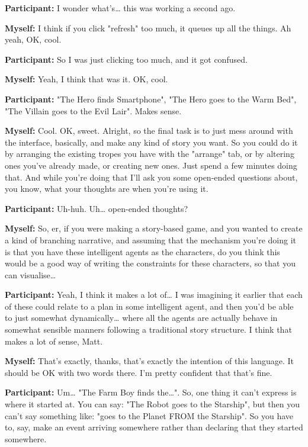 \documentclass[11pt]{report}
\begin{document}
\begin{linenumbers}
\textbf{Participant:} I wonder what's\ldots{} this was working a second ago.

\textbf{Myself:} I think if you click "refresh" too much, it queues up all the things. Ah yeah, OK, cool.

\textbf{Participant:} So I was just clicking too much, and it got confused.

\textbf{Myself:} Yeah, I think that was it. OK, cool.

\textbf{Participant:} "The Hero finds Smartphone", "The Hero goes to the Warm Bed", "The Villain goes to the Evil Lair". Makes sense.

\textbf{Myself:} Cool. OK, sweet. Alright, so the final task is to just mess around with the interface, basically, and make any kind of story you want. So you could do it by arranging the existing tropes you have with the "arrange" tab, or by altering ones you've already made, or creating new ones. Just spend a few minutes doing that. And while you're doing that I'll ask you some open-ended questions about, you know, what your thoughts are when you're using it.

\textbf{Participant:} Uh-huh. Uh\ldots{} open-ended thoughts?

\textbf{Myself:} So, er, if you were making a story-based game, and you wanted to create a kind of branching narrative, and assuming that the mechanism you're doing it is that you have these intelligent agents as the characters, do you think this would be a good way of writing the constraints for these characters, so that you can visualise\ldots{}

\textbf{Participant:} Yeah, I think it makes a lot of\ldots{} I was imagining it
earlier that each of these could relate to a plan in some intelligent agent, and
then you'd be able to just somewhat dynamically\ldots{} where all the agents are
actually behave in somewhat sensible manners following a traditional story
structure. I think that makes a lot of sense, Matt.

\textbf{Myself:} That's exactly, thanks, that's exactly the intention of this language. It should be OK with two words there. I'm pretty confident that that's fine.

\textbf{Participant:} Um\ldots{} "The Farm Boy finds the\ldots{}". So, one thing
it can't express is where it started at. You can say: "The Robot goes to the
Starship", but then you can't say something like: "goes to the Planet FROM the
Starship". So you have to, say, make an event arriving somewhere rather than
declaring that they started somewhere.


\end{linenumbers}
\end{document}
